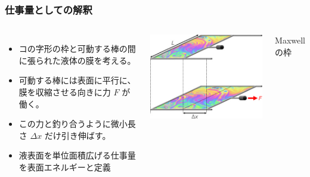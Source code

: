 \documentclass[12pt, dvipdfmx]{beamer}
\begin{document}
\begin{frame}
	\frametitle{仕事量としての解釈}
	\vspace{-3mm}
	\begin{columns}[c, onlytextwidth]
				\begin{itemize}
					\item コの字形の枠と可動する棒の間に張られた液体の膜を考える。
					\item 可動する棒には表面に平行に、膜を収縮させる向きに力 $F$ が働く。
					\item この力と釣り合うように微小長さ $\Delta x$ だけ引き伸ばす。
					\item \alert{液表面を単位面積広げる仕事量}を表面エネルギーと定義
				\end{itemize}
		\centering
		\includegraphics[width=\textwidth]{maxwells-frame.jpg}

		\vspace{2mm}
		Maxwell の枠
	\end{columns}
	


\end{frame}
\end{document}
